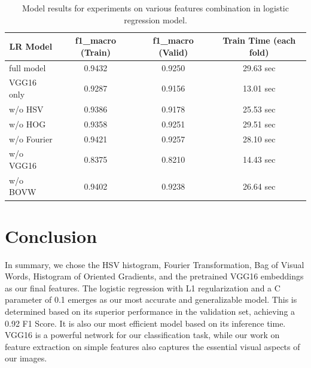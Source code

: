 \documentclass[11pt]{article}
\begin{document}
\begin{table}[h!]
    \centering
    \begin{tabular}{|p{4cm}|c|c|c|}
        \hline
        \multicolumn{1}{|c|}{\textbf{LR Model}} & \textbf{f1\_macro (Train)} & \textbf{f1\_macro (Valid)} & \textbf{Train Time (each fold)} \\
        \hline
        full model & 0.9432 & 0.9250 & 29.63 sec \\
        \hline
        VGG16 only & 0.9287 & 0.9156 & 13.01 sec \\
        \hline
        w/o HSV & 0.9386 & 0.9178 & 25.53 sec \\
        \hline
        w/o HOG & 0.9358 & 0.9251 & 29.51 sec \\
        \hline
        w/o Fourier & 0.9421 & 0.9257 & 28.10 sec \\
        \hline
        w/o VGG16 & 0.8375 & 0.8210 & 14.43 sec \\
        \hline
        w/o BOVW & 0.9402 & 0.9238 & 26.64 sec \\
        \hline
    \end{tabular}
    \caption{Model results for experiments on various features combination in logistic regression model. }
    \label{table:feature_combination}
\end{table}


\section{Conclusion}
In summary, we chose the HSV histogram, Fourier Transformation, Bag of Visual Words, Histogram of Oriented Gradients, and the pretrained VGG16 embeddings as our final features. The logistic regression with L1 regularization and a C parameter of 0.1 emerges as our most accurate and generalizable model. This is determined based on its superior performance in the validation set, achieving a 0.92 F1 Score. It is also our most efficient model based on its inference time. VGG16 is a powerful network for our classification task, while our work on feature extraction on simple features also captures the essential visual aspects of our images.



\end{document}
